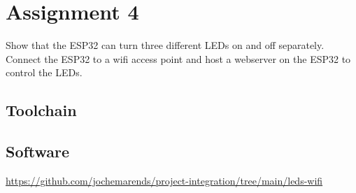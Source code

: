 \section{Assignment 4}
Show that the ESP32 can turn three different LEDs on and off separately. Connect the ESP32 to a \gls{wifi} access point and host a webserver on the ESP32 to control the LEDs.

\subsection{Toolchain}

\subsection{Software}
\url{https://github.com/jochemarends/project-integration/tree/main/leds-wifi}
\clearpage
